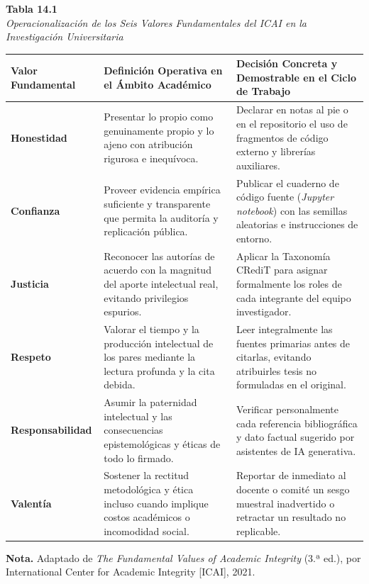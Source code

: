 \begin{table}[htbp]
\centering
\small
\renewcommand{\arraystretch}{1.25}
\textbf{Tabla 14.1}\\[0.15cm]
\textit{Operacionalización de los Seis Valores Fundamentales del ICAI en la Investigación Universitaria}\\[0.25cm]
\begin{tabularx}{\textwidth}{p{2.6cm}X p{5.5cm}}
\toprule
\textbf{Valor Fundamental} & \textbf{Definición Operativa en el Ámbito Académico} & \textbf{Decisión Concreta y Demostrable en el Ciclo de Trabajo} \\
\midrule
\textbf{Honestidad} & Presentar lo propio como genuinamente propio y lo ajeno con atribución rigurosa e inequívoca. & Declarar en notas al pie o en el repositorio el uso de fragmentos de código externo y librerías auxiliares. \\
\textbf{Confianza} & Proveer evidencia empírica suficiente y transparente que permita la auditoría y replicación pública. & Publicar el cuaderno de código fuente (\textit{Jupyter notebook}) con las semillas aleatorias e instrucciones de entorno. \\
\textbf{Justicia} & Reconocer las autorías de acuerdo con la magnitud del aporte intelectual real, evitando privilegios espurios. & Aplicar la Taxonomía CRediT para asignar formalmente los roles de cada integrante del equipo investigador. \\
\textbf{Respeto} & Valorar el tiempo y la producción intelectual de los pares mediante la lectura profunda y la cita debida. & Leer integralmente las fuentes primarias antes de citarlas, evitando atribuirles tesis no formuladas en el original. \\
\textbf{Responsabilidad} & Asumir la paternidad intelectual y las consecuencias epistemológicas y éticas de todo lo firmado. & Verificar personalmente cada referencia bibliográfica y dato factual sugerido por asistentes de IA generativa. \\
\textbf{Valentía} & Sostener la rectitud metodológica y ética incluso cuando implique costos académicos o incomodidad social. & Reportar de inmediato al docente o comité un sesgo muestral inadvertido o retractar un resultado no replicable. \\
\bottomrule
\end{tabularx}
\vspace{0.15cm}
\raggedright \scriptsize \textbf{Nota.} Adaptado de \textit{The Fundamental Values of Academic Integrity} (3.ª ed.), por International Center for Academic Integrity [ICAI], 2021.
\end{table}

